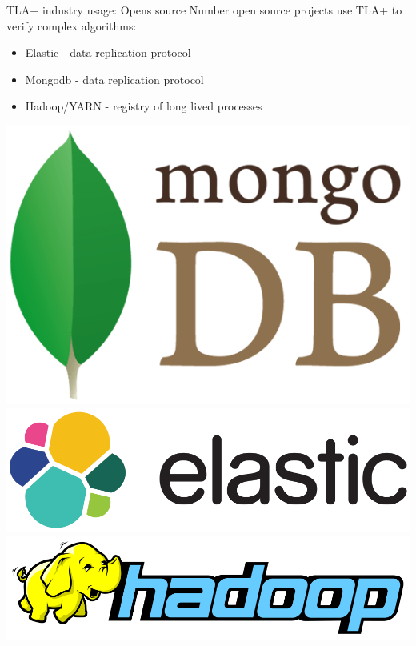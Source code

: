 \documentclass[12pt]{beamer}
\begin{document}
  \begin{frame}{TLA+ industry usage: Opens source}
      Number open source projects use TLA+ to verify complex algorithms:
    \begin{itemize}
        \item Elastic - data replication protocol \cite{elastic2017}
        \item Mongodb - data replication protocol \cite{mongo2016}
        \item Hadoop/YARN - registry of long lived processes \cite{hadoop2017}
    \end{itemize}
    \begin{center}
        \includegraphics[scale=0.1]{figures/mongo}
        \includegraphics[scale=0.12]{figures/elastic}
        \includegraphics[scale=0.14]{figures/hadoop}
    \end{center}
  \end{frame}
\end{document}
